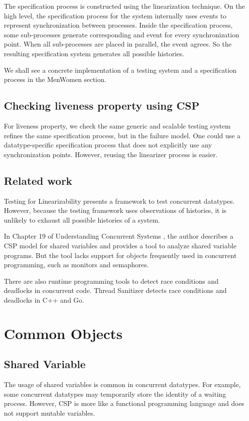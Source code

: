 \documentclass[a4paper, 12pt]{article}
\begin{document}
The specification process is constructed using the linearization technique. On the high level, the specification process for the system internally uses  events to represent synchronization between processes. Inside the specification process, some sub-processes generate corresponding  and  event for every synchronization point. When all sub-processes are placed in parallel, the  event agrees. So the resulting specification system generates all possible histories. 

We shall see a concrete implementation of a testing system and a specification process in the MenWomen section. 

\subsection{Checking liveness property using CSP}
For liveness property, we check the same generic and scalable testing system refines the same specification process, but in the failure model. One could use a datatype-specific specification process that does not explicitly use any synchronization points. However, reusing the linearizer process is easier. 

\subsection{Related work}
Testing for Linearizability \cite{linearizability-testing} presents a framework to test concurrent datatypes. However, because the testing framework uses observations of histories, it is unlikely to exhaust all possible histories of a system.

In Chapter 19 of Understanding Concurrent Systems \cite{ucs-book}, the author describes a CSP model for shared variables and provides a tool to analyze shared variable programs. But the tool lacks support for objects frequently used in concurrent programming, such as monitors and semaphores.

There are also runtime programming tools to detect race conditions and deadlocks in concurrent code. Thread Sanitizer \cite{threadsanitizer} detects race conditions and deadlocks in C++ and Go.
\section{Common Objects}
\subsection{Shared Variable}
The usage of shared variables is common in concurrent datatypes. For example, some concurrent datatypes may temporarily store the identity of a waiting process. However, CSP is more like a functional programming language and does not support mutable variables. 
\end{document}
